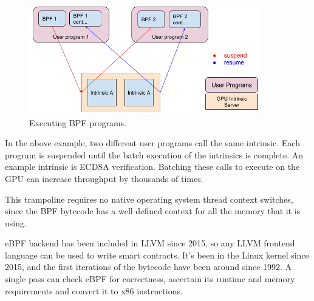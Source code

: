 \documentclass[12pt]{article}
\begin{document}
\begin{figure}
  \begin{center}
    \centering
    \includegraphics[width=0.9\textwidth]{figures/bpf_programs_001.png}
    \caption[Fig 11]{Executing  BPF programs.\label{fig_11}}
  \end{center}
  \end{figure}

In the above example, two different user programs call the same intrinsic. Each program is suspended until the batch execution of the intrinsics is complete. An example intrinsic is ECDSA verification. Batching these calls to execute on the GPU can increase throughput by thousands of times.

This trampoline requires no native operating system thread context switches, since the BPF bytecode has a well defined context for all the memory that it is using.

eBPF backend has been included in LLVM since 2015, so any LLVM frontend language can be used to write smart contracts. It’s been in the Linux kernel since 2015, and the first iterations of the bytecode have been around since 1992. A single pass can check eBPF for correctness, ascertain its runtime and memory requirements and convert it to x86 instructions.



\end{document}
